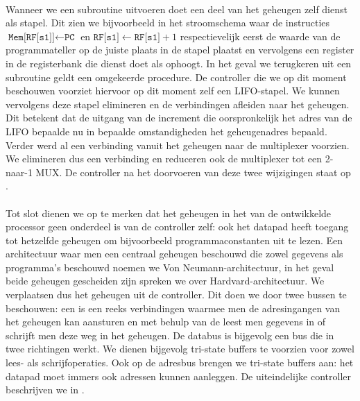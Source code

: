 \paragraph{}
Wanneer we een subroutine uitvoeren doet een deel van het geheugen zelf dienst als stapel. Dit zien we bijvoorbeeld in het stroomschema waar de instructies $\texttt{Mem[RF[s1]]}\leftarrow\texttt{PC}$ en $\texttt{RF[s1]}\leftarrow\texttt{RF[s1]}+1$ respectievelijk eerst de waarde van de programmateller op de juiste plaats in de stapel plaatst en vervolgens een register in de registerbank die dienst doet als  ophoogt. In het geval we terugkeren uit een subroutine geldt een omgekeerde procedure. De controller die we op dit moment beschouwen voorziet hiervoor op dit moment zelf een LIFO-stapel. We kunnen vervolgens deze stapel elimineren en de verbindingen afleiden naar het geheugen. Dit betekent dat de uitgang van de increment die oorspronkelijk het adres van de LIFO bepaalde nu in bepaalde omstandigheden het geheugenadres bepaald. Verder werd al een verbinding vanuit het geheugen naar de multiplexer voorzien. We elimineren dus een verbinding en reduceren ook de multiplexer tot een 2-naar-1 MUX. De controller na het doorvoeren van deze twee wijzigingen staat op .
\paragraph{}
Tot slot dienen we op te merken dat het geheugen in het van de ontwikkelde processor geen onderdeel is van de controller zelf: ook het datapad heeft toegang tot hetzelfde geheugen om bijvoorbeeld programmaconstanten uit te lezen. Een architectuur waar men een centraal geheugen beschouwd die zowel gegevens als programma's beschouwd noemen we Von Neumann-architectuur, in het geval beide geheugen gescheiden zijn spreken we over Hardvard-architectuur. We verplaatsen dus het geheugen uit de controller. Dit doen we door twee bussen te beschouwen: een  is een reeks verbindingen waarmee men de adresingangen van het geheugen kan aansturen en met behulp van de  leest men gegevens in of schrijft men deze weg in het geheugen. De databus is bijgevolg een bus die in twee richtingen werkt. We dienen bijgevolg tri-state buffers te voorzien voor zowel lees- als schrijfoperaties. Ook op de adresbus brengen we tri-state buffers aan: het datapad moet immers ook adressen kunnen aanleggen. De uiteindelijke controller beschrijven we in .
